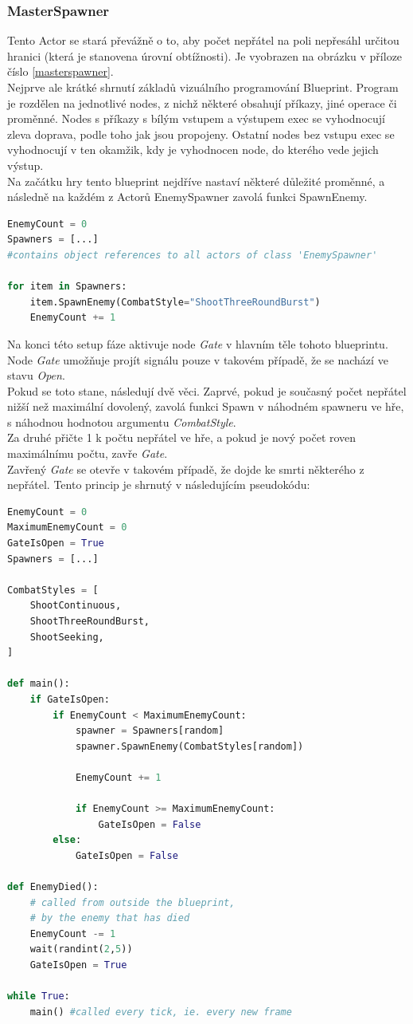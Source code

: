 \documentclass[12pt,a4paper,hidelinks]{article}
\begin{document}
\subsubsection{MasterSpawner}
Tento Actor se stará převážně o to, aby počet nepřátel na poli nepřesáhl určitou hranici (která je stanovena úrovní obtížnosti). Je vyobrazen na obrázku v příloze číslo \ref{masterspawner}.\\
Nejprve ale krátké shrnutí základů vizuálního programování Blueprint. Program je rozdělen na jednotlivé nodes, z nichž některé obsahují příkazy, jiné operace či proměnné. Nodes s příkazy s bílým vstupem a výstupem exec se vyhodnocují zleva doprava, podle toho jak jsou propojeny. Ostatní nodes bez vstupu exec se vyhodnocují v ten okamžik, kdy je vyhodnocen node, do kterého vede jejich výstup.\\
Na začátku hry tento blueprint nejdříve nastaví některé důležité proměnné, a následně na každém z Actorů EnemySpawner zavolá funkci SpawnEnemy.\\
\begin{lstlisting}[language=Python]
EnemyCount = 0
Spawners = [...]
#contains object references to all actors of class 'EnemySpawner'

for item in Spawners:
	item.SpawnEnemy(CombatStyle="ShootThreeRoundBurst")
	EnemyCount += 1
\end{lstlisting}
Na konci této setup fáze aktivuje node \textit{Gate} v hlavním těle tohoto blueprintu.\\
Node \textit{Gate} umožňuje projít signálu pouze v takovém případě, že se nachází ve stavu \textit{Open}.\\
Pokud se toto stane, následují dvě věci. Zaprvé, pokud je současný počet nepřátel nižší než maximální dovolený, zavolá funkci Spawn v náhodném spawneru ve hře, s náhodnou hodnotou argumentu \textit{CombatStyle}.\\
Za druhé přičte 1 k počtu nepřátel ve hře, a pokud je nový počet roven maximálnímu počtu, zavře \textit{Gate}.\\
Zavřený \textit{Gate} se otevře v takovém případě, že dojde ke smrti některého z nepřátel.
Tento princip je shrnutý v následujícím pseudokódu:\\
\begin{lstlisting}[language=Python]
EnemyCount = 0
MaximumEnemyCount = 0
GateIsOpen = True
Spawners = [...]

CombatStyles = [
	ShootContinuous,
	ShootThreeRoundBurst,
	ShootSeeking,
]

def main():
	if GateIsOpen:
		if EnemyCount < MaximumEnemyCount:
			spawner = Spawners[random]
			spawner.SpawnEnemy(CombatStyles[random])
			
			EnemyCount += 1
			
			if EnemyCount >= MaximumEnemyCount:
				GateIsOpen = False
		else:
			GateIsOpen = False

def EnemyDied():
	# called from outside the blueprint,
	# by the enemy that has died
	EnemyCount -= 1
	wait(randint(2,5))
	GateIsOpen = True
	
while True: 
	main() #called every tick, ie. every new frame

\end{lstlisting}
\end{document}
